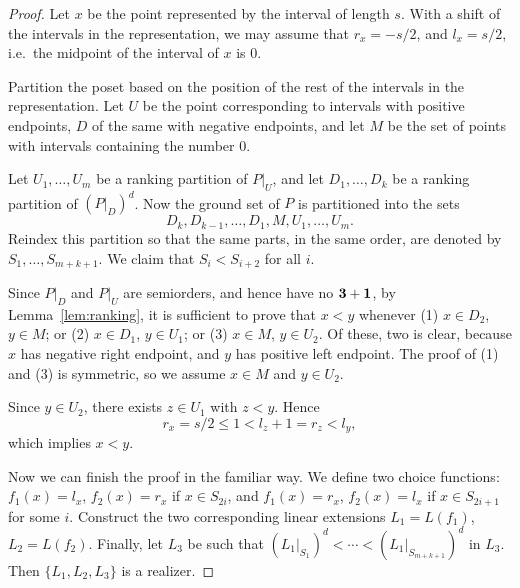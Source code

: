\begin{proof}
Let $x$ be the point represented by the interval of length $s$. With a shift of the intervals in the representation, we may assume that $r_x=-s/2$, and $l_x=s/2$, i.e.\ the midpoint of the interval of $x$ is $0$.

Partition the poset based on the position of the rest of the intervals in the representation. Let $U$ be the point corresponding to intervals with positive endpoints, $D$ of the same with negative endpoints, and let $M$ be the set of points with intervals containing the number $0$.

Let $U_1,\ldots,U_m$ be a ranking partition of $P|_U$, and let $D_1,\ldots,D_k$ be a ranking partition of $(P|_D)^d$. Now the ground set of $P$ is partitioned into the sets
\[
D_k,D_{k-1},\ldots,D_1,M,U_1,\ldots,U_m.
\]
Reindex this partition so that the same parts, in the same order, are denoted by $S_1,\ldots,S_{m+k+1}$. We claim that $S_i<S_{i+2}$ for all $i$.

Since $P|_D$ and $P|_U$ are semiorders, and hence have no $\mathbf{3}+\mathbf{1}$, by Lemma~\ref{lem:ranking}, it is sufficient to prove that $x<y$ whenever (1) $x\in D_2$, $y\in M$; or (2) $x\in D_1$, $y\in U_1$; or (3) $x\in M$, $y\in U_2$. Of these, two is clear, because $x$ has negative right endpoint, and $y$ has positive left endpoint. The proof of (1) and (3) is symmetric, so we assume $x\in M$ and $y\in U_2$.

Since $y\in U_2$, there exists $z\in U_1$ with $z<y$. Hence
\[
r_x=s/2\leq 1<l_z+1=r_z<l_y,
\]
which implies $x<y$.

Now we can finish the proof in the familiar way. We define two choice functions: $f_1(x)=l_x$, $f_2(x)=r_x$ if $x\in S_{2i}$, and $f_1(x)=r_x$, $f_2(x)=l_x$ if $x\in S_{2i+1}$ for some $i$. Construct the two corresponding linear extensions $L_1=L(f_1)$, $L_2=L(f_2)$. Finally, let $L_3$ be such that $(L_1|_{S_1})^d<\cdots<(L_1|_{S_{m+k+1}})^d$ in $L_3$. Then $\{L_1,L_2,L_3\}$ is a realizer.
\end{proof}
